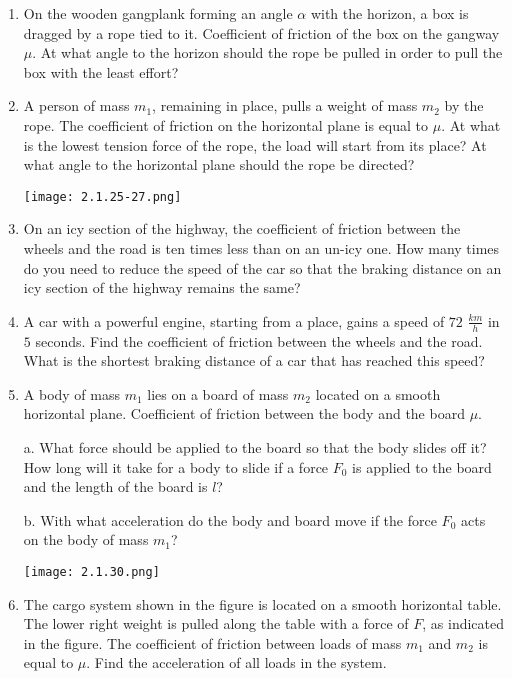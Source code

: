 \documentclass{article}
\begin{document}
\begin{enumerate}[label=2.1.\arabic*]
\item On the wooden gangplank forming an angle $\alpha$ with the horizon, a box is dragged by a rope tied to it. Coefficient of friction of the box on the gangway $\mu$. At what angle to the horizon should the rope be pulled in order to pull the box with the least effort?

\item A person of mass $m_1$, remaining in place, pulls a weight of mass $m_2$ by the rope. The coefficient of friction on the horizontal plane is equal to $\mu$. At what is the lowest tension force of the rope, the load will start from its place? At what angle to the horizontal plane should the rope be directed?

\begin{center}
    \texttt{[image: 2.1.25-27.png]}
\end{center}

\item On an icy section of the highway, the coefficient of friction between the wheels and the road is ten times less than on an un-icy one. How many times do you need to reduce the speed of the car so that the braking distance on an icy section of the highway remains the same?

\item A car with a powerful engine, starting from a place, gains a speed of $72$ $\frac{km}{h}$ in $5$ seconds. Find the coefficient of friction between the wheels and the road. What is the shortest braking distance of a car that has reached this speed?

\item A body of mass $m_1$ lies on a board of mass $m_2$ located on a smooth horizontal plane. Coefficient of friction between the body and the board $\mu$.

a. What force should be applied to the board so that the body slides off it? How long will it take for a body to slide if a force $F_0$ is applied to the board and the length of the board is $l$?

b. With what acceleration do the body and board move if the force $F_0$ acts on the body of mass $m_1$?

\begin{center}
    \texttt{[image: 2.1.30.png]}
\end{center}

\item The cargo system shown in the figure is located on a smooth horizontal table. The lower right weight is pulled along the table with a force of $F$, as indicated in the figure. The coefficient of friction between loads of mass $m_1$ and $m_2$ is equal to $\mu$. Find the acceleration of all loads in the system.


\end{enumerate}
\end{document}
